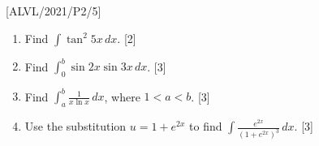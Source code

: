 \item {[}ALVL/2021/P2/5{]}
\begin{enumerate}
\item Find $\int\tan^{2}5x\,dx$. \hfill{} {[}2{]}
\item Find $\int_{0}^{b}\sin2x\sin3x\,dx$. \hfill{} {[}3{]}
\item Find $\int_{a}^{b}\frac{1}{x\ln x}\,dx$, where $1<a<b$. \hfill{}{[}3{]}
\item Use the substitution $u=1+e^{2x}$ to find $\int\frac{e^{2x}}{\left(1+e^{2x}\right)^{3}}\,dx$.
\hfill{}{[}3{]}
\end{enumerate}
